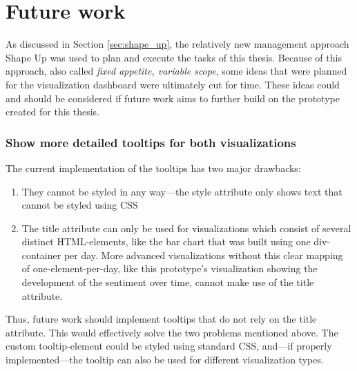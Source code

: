 \section{Future work}\label{sec:cutForTime}
As discussed in Section \ref{sec:shape_up}, the relatively new management approach Shape Up was used to plan and execute the tasks of this thesis. Because of this approach, also called \emph{fixed appetite, variable scope}, some ideas that were planned for the visualization dashboard were ultimately cut for time. These ideas could and should be considered if future work aims to further build on the prototype created for this thesis.

\subsubsection*{Show more detailed tooltips for both visualizations}\label{fw_tooltips}
The current implementation of the tooltips has two major drawbacks:
\begin{enumerate}
    \item They cannot be styled in any way---the style attribute only shows text that cannot be styled using CSS
    \item The title attribute can only be used for visualizations which consist of several distinct HTML-elements, like the bar chart that was built using one div-container per day. More advanced visualizations without this clear mapping of one-element-per-day, like this prototype's visualization showing the development of the sentiment over time, cannot make use of the title attribute.
\end{enumerate}

Thus, future work should implement tooltips that do not rely on the title attribute. This would effectively solve the two problems mentioned above. The custom tooltip-element could be styled using standard CSS, and---if properly implemented---the tooltip can also be used for different visualization types. 

